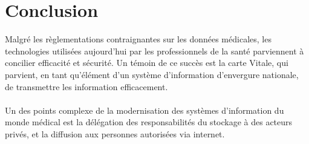     \section*{Conclusion}

Malgré les règlementations contraignantes sur les données médicales,
les technologies utilisées aujourd'hui par les professionnels de la santé
parviennent à concilier efficacité et sécurité. Un témoin de ce succès est la
carte Vitale, qui parvient, en tant qu'élément d'un système d'information
d'envergure nationale, de transmettre les information efficacement.

\paragraph{}
Un des points complexe de la modernisation des systèmes d'information du monde
médical est la délégation des responsabilités du stockage à des acteurs privés,
et la diffusion aux personnes autorisées via internet.
